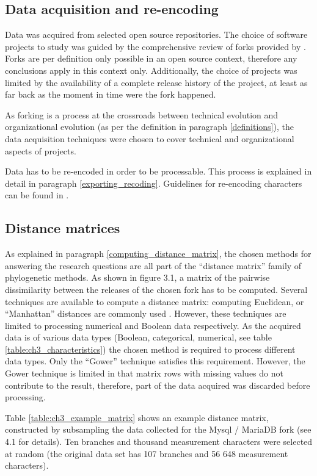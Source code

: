 \subsection{Data acquisition and re-encoding}
Data was acquired from selected open source repositories. The choice of software projects to study was guided by the comprehensive review of forks provided by \citet{Robles2012a}. Forks are per definition only possible in an open source context, therefore any conclusions apply in this context only. Additionally, the choice of projects was limited by the availability of a complete release history of the project, at least as far back as the moment in time were the fork happened.

As forking is a process at the crossroads between technical evolution and organizational evolution (as per the definition in paragraph \ref{definitions}), the data acquisition techniques were chosen to cover technical and organizational aspects of projects.

Data has to be re-encoded in order to be processable. This process is explained in detail in paragraph \ref{exporting_recoding}. Guidelines for re-encoding characters can be found in \citet{Sokal1986a}.

\subsection{Distance matrices}
As explained in paragraph \ref{computing_distance_matrix}, the chosen methods for answering the research questions are all part of the “distance matrix” family of phylogenetic methods. As shown in figure 3.1, a matrix of the pairwise dissimilarity between the releases of the chosen fork has to be computed. Several techniques are available to compute a distance matrix: computing Euclidean, or “Manhattan” distances are commonly used \citep{Felsenstein1982a}. However, these techniques are limited to processing numerical and Boolean data respectively. As the acquired data is of various data types (Boolean, categorical, numerical, see table \ref{table:ch3_characteristics}) the chosen method is required to process different data types. Only the “Gower” technique \citep{DOrazio2016} satisfies this requirement. However, the Gower technique is limited in that matrix rows with missing values do not contribute to the result, therefore, part of the data acquired was discarded before processing.

Table \ref{table:ch3_example_matrix} shows an example distance matrix, constructed by subsampling the data collected for the Mysql / MariaDB fork (see 4.1 for details). Ten branches and thousand measurement characters were selected at random (the original data set has 107 branches and 56 648 measurement characters).

